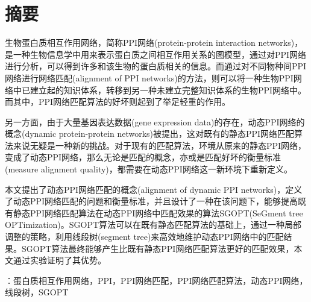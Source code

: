 \chapter*{摘要}
生物蛋白质相互作用网络，简称PPI网络(protein-protein interaction networks)，是一种生物信息学中用来表示蛋白质之间相互作用关系的图模型，通过对PPI网络进行分析，可以得到许多和该生物的蛋白质相关的信息。而通过对不同物种间PPI网络进行网络匹配(alignment of PPI networks)的方法，则可以将一种生物PPI网络中已建立起的知识体系，转移到另一种未建立完整知识体系的生物PPI网络中。而其中，PPI网络匹配算法的好坏则起到了举足轻重的作用。

另一方面，由于大量基因表达数据(gene expression data)的存在，动态PPI网络的概念(dynamic protein-protein networks)被提出，这对既有的静态PPI网络匹配算法来说无疑是一种新的挑战。对于现有的匹配算法，环境从原来的静态PPI网络，变成了动态PPI网络，那么无论是匹配的概念，亦或是匹配好坏的衡量标准(measure alignment quality)，都需要在动态PPI网络这一新环境下重新定义。

本文提出了动态PPI网络匹配的概念(alignment of dynamic PPI networks)，定义了动态PPI网络匹配的问题和衡量标准，并且设计了一种在该问题下，能够提高既有静态PPI网络匹配算法在动态PPI网络中匹配效果的算法SGOPT(SeGment tree OPTimization)。SGOPT算法可以在既有静态匹配算法的基础上，通过一种局部调整的策略，利用线段树(segment tree)来高效地维护动态PPI网络中的匹配结果。SGOPT算法最终能够产生比既有静态PPI网络匹配算法更好的匹配效果，本文通过实验证明了其优势。


：蛋白质相互作用网络，PPI，PPI网络匹配，PPI网络匹配算法，动态PPI网络，线段树，SGOPT

